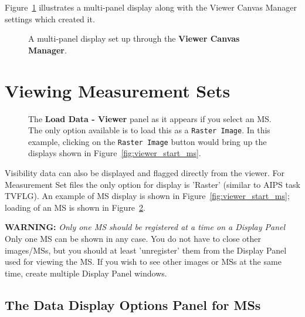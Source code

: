 Figure~\ref{fig:viewer_canvas} illustrates a multi-panel display along
with the Viewer Canvas Manager settings which created it. 

\begin{figure}[h!]
\caption{\label{fig:viewer_canvas} A multi-panel display
set up through the {\bf Viewer Canvas Manager}.} 
\hrulefill
\end{figure}
 

\section{Viewing Measurement Sets}
\label{section:display.ms}

\begin{figure}[h!]
\caption{\label{fig:viewer_load_ms} The {\bf Load Data - Viewer} panel
as it appears if you select an MS.  The only option available is
to load this as a {\tt Raster Image}.  In this example, clicking
on the {\tt Raster Image} button would bring up the displays shown
in Figure~\ref{fig:viewer_start_ms}.}
\hrulefill
\end{figure}

Visibility data can also be displayed and flagged directly from the
viewer. For Measurement Set files the only option for display is 'Raster'
(similar to AIPS task TVFLG).  An example of MS display is
shown in Figure~\ref{fig:viewer_start_ms}; loading of an
MS is shown in Figure~\ref{fig:viewer_load_ms}.  

{\bf WARNING:} {\em Only one MS should be registered at a time on a
Display Panel} 
Only one MS can be shown in any case.  
You do not have to close other images/MSs, but you should at
least 'unregister' them from the Display Panel used for viewing the MS.
If you wish to see other images or MSs at the same time, create multiple
Display Panel windows.

 


\subsection{The Data Display Options Panel for MSs}
\label{section:display.ms.adjust}

